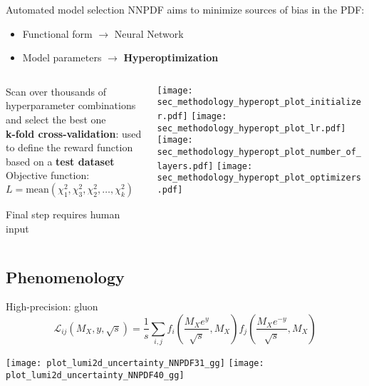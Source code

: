 \begin{frame}[t]{Automated model selection}
  NNPDF aims to minimize sources of bias in the PDF:
  \begin{itemize}
      \item Functional form $\rightarrow$ Neural Network
      \item Model parameters $\rightarrow$ \textbf{Hyperoptimization}
  \end{itemize}
    \begin{columns}
        \begin{column}{0.48\textwidth}
            Scan over thousands of hyperparameter combinations and select the best one \\
            \vspace*{0.8em}
            {\bf k-fold cross-validation}: used to define the reward function based on a {\bf test dataset}\\
            \vspace*{0.8em}
            Objective function: \\
            $L=\textrm{mean}(\chi_1^2,\chi_3^2,\chi_2^2,\ldots, \chi_k^2)$

            \vspace*{0.3cm}
            Final step requires human input
        \end{column}
        \begin{column}{0.48\textwidth}
            \begin{center}
                \texttt{[image: sec\_methodology\_hyperopt\_plot\_initializer.pdf]}
                \texttt{[image: sec\_methodology\_hyperopt\_plot\_lr.pdf]} \\
                \texttt{[image: sec\_methodology\_hyperopt\_plot\_number\_of\_layers.pdf]}
                \texttt{[image: sec\_methodology\_hyperopt\_plot\_optimizers.pdf]}
            \end{center}
        \end{column}
    \end{columns}
\end{frame}


\subsection{Phenomenology}


\begin{frame}[t]{High-precision: gluon}
  \begin{equation*}
  \mathcal{L}_{i j}\left(M_{X}, y, \sqrt{s}\right)
  =\frac{1}{s} \sum_{i, j} f_{i}\left(\frac{M_{X} e^{y}}{\sqrt{s}}, M_{X}\right) f_{j}\left(\frac{M_{X} e^{-y}}{\sqrt{s}}, M_{X}\right)
  \end{equation*}
  \begin{center}
    \texttt{[image: plot\_lumi2d\_uncertainty\_NNPDF31\_gg]}
    \texttt{[image: plot\_lumi2d\_uncertainty\_NNPDF40\_gg]}
  \end{center}
\end{frame}


